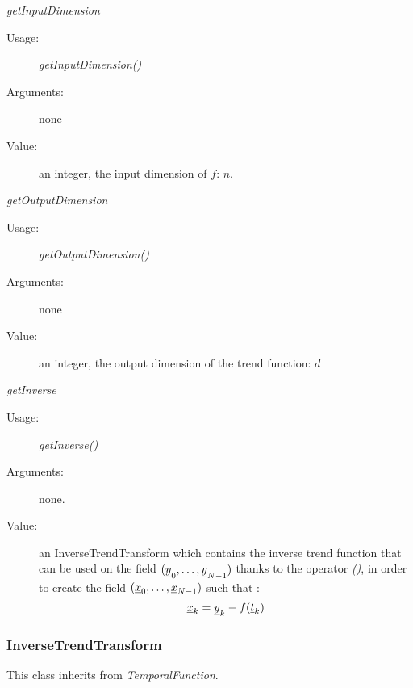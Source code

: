 \begin{description}
\begin{description}
\item \textit{getInputDimension}
\begin{description}
\item[Usage:] \textit{getInputDimension()}
\item[Arguments:] none
\item[Value:]   an integer, the input dimension of $f$: $n$.
\end{description}
\bigskip

\item \textit{getOutputDimension}
\begin{description}
\item[Usage:] \textit{getOutputDimension()}
\item[Arguments:] none
\item[Value:]   an integer, the output dimension of the trend function: $d$
\end{description}
\bigskip

\item \textit{getInverse}
\begin{description}
\item[Usage:] \textit{getInverse()}
\item[Arguments:] none.
\item[Value:]   an InverseTrendTransform which contains the inverse trend function that can be used on the field $({\underline{y}}_{0}, \dots,{\underline{y}}_{N-1})$ thanks to the operator  \emph{()}, in order to create the field $({\underline{x}}_{0}, \dots,{\underline{x}}_{N-1})$ such that :
\begin{equation}
{\underline{x}}_k = {\underline{y}}_k - f({\underline{t}}_k)
\end{equation}

\end{description}
\bigskip

\end{description}

\end{description}

\newpage
\subsubsection{InverseTrendTransform}

This class inherits from \textit{TemporalFunction}.

